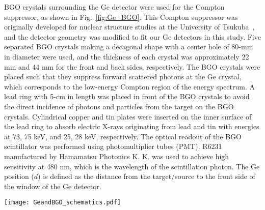 BGO crystals surrounding the Ge detector were used for the Compton suppressor, as shown in Fig.~\ref{fig:Ge_BGO}. 
This Compton suppressor was originally developed for nuclear structure studies at the University of Tsukuba~\cite{BGO_tsukuba1, BGO_tsukuba2, BGO_tsukuba3}, and the detector geometry was modified to fit our Ge detectors in this study.
Five separated BGO crystals making a decagonal shape with a center hole of 80-mm in diameter were used, and %
the thickness of each crystal was approximately 22 mm and 44 mm for the front and back sides, respectively. 
The BGO crystals were placed %
such that they suppress forward scattered photons at the Ge crystal, which corresponds to the low-energy Compton region of the energy spectrum. 
A lead ring with 5-cm in length was placed in front of the BGO crystals %
to avoid the direct incidence of photons and particles from the target on the BGO crystals.
Cylindrical copper and tin plates were inserted on the inner surface of the lead ring to absorb electric X-rays originating from lead and tin with energies at 73, 75 keV, and 25, 28 keV, respectively.
The optical readout of the BGO scintillator was performed using photomultiplier tubes (PMT).
R6231 manufactured by Hamamatsu Photonics K. K. was used to achieve high sensitivity at 480 nm, which is the wavelength of the scintillation photon.
The Ge position ($d$) is defined as the distance from the target/source to the front side of the window of the Ge detector.


\begin{figure*}[width=0.85\textwidth, cols=4,pos=h]
  \centering
  \texttt{[image: GeandBGO\_schematics.pdf]}
  \caption{Cross-sectional view (a) and schematics (b) of the Ge detector with Compton suppressors. The point in figure~(a) shows the target or source position, and the Ge position ($d$) is defined as the distance from the target/source to the front side of the window of the Ge detector.}
  \label{fig:Ge_BGO}
\end{figure*}



